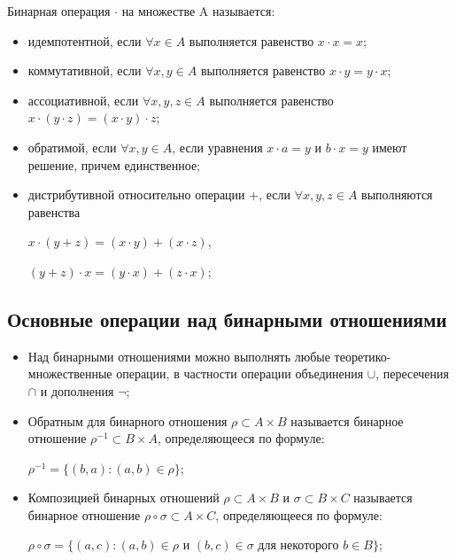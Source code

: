 \documentclass[bachelor, och, labwork]{shiza}
\begin{document}
    Бинарная операция $\cdot$ на множестве A называется:

    \begin{itemize}
        \item идемпотентной, если $\forall x \in A$ выполняется равенство $x \cdot x = x$;

        \item коммутативной, если $\forall x, y \in A$ выполняется равенство $x \cdot y = y \cdot x$;

        \item ассоциативной, если $\forall x, y, z \in A$ выполняется равенство $x \cdot (y \cdot z) = (x \cdot y) \cdot z$;

        \item обратимой, если $\forall x, y \in A$, если уравнения $x \cdot a = y$ и $b \cdot x = y$  имеют решение, причем единственное;
        \item дистрибутивной относительно операции +, если $\forall x, y, z \in A$ выполняются равенства
        
        \begin{center}
            $x \cdot (y + z) = (x \cdot y) + (x \cdot z)$,

            $(y + z) \cdot x = (y \cdot x) + (z \cdot x)$;
        \end{center}
    \end{itemize}

    \subsection{Основные операции над бинарными отношениями}

    \begin{itemize}
        \item Над бинарными отношениями можно выполнять любые теоретико-множественные операции, в частности операции
        объединения $\cup$, пересечения $\cap$ и дополнения $\lnot$;
        \item Обратным для бинарного отношения $\rho \subset A \times B$ называется бинарное
        отношение $\rho^{-1} \subset B \times A$, определяющееся по формуле:
        \begin{center}
            $\rho^{-1} = \{(b, a) : (a, b) \in \rho \}$;
        \end{center}
        \item Композицией бинарных отношений $\rho \subset A \times B$ и $\sigma \subset B \times C$
        называется бинарное отношение $\rho \circ \sigma \subset A \times C$, определяющееся по формуле:
        \begin{center}
            $\rho \circ \sigma = \{ (a, c) : (a, b) \in \rho \text{ и } (b, c) \in \sigma \text{ для некоторого } b \in B \}$;
        \end{center}
    \end{itemize}
\end{document}
